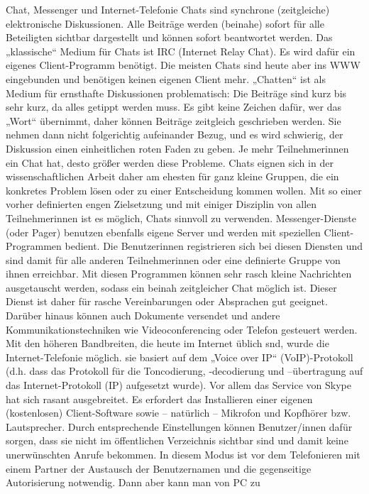\documentclass[]{book}
\theoremstyle{definition}
\theoremstyle{definition}
\theoremstyle{definition}
\theoremstyle{remark}
\begin{document}
Chat, Messenger und Internet-Telefonie Chats sind synchrone
(zeitgleiche) elektronische Diskussionen. Alle Beiträge werden (beinahe)
sofort für alle Beteiligten sichtbar dargestellt und können sofort
beantwortet werden. Das „klassische`` Medium für Chats ist IRC (Internet
Relay Chat). Es wird dafür ein eigenes Client-Programm benötigt. Die
meisten Chats sind heute aber ins WWW eingebunden und benötigen keinen
eigenen Client mehr. „Chatten`` ist als Medium für ernsthafte
Diskussionen problematisch: Die Beiträge sind kurz bis sehr kurz, da
alles getippt werden muss. Es gibt keine Zeichen dafür, wer das „Wort``
übernimmt, daher können Beiträge zeitgleich geschrieben werden. Sie
nehmen dann nicht folgerichtig aufeinander Bezug, und es wird schwierig,
der Diskussion einen einheitlichen roten Faden zu geben. Je mehr
Teilnehmerinnen ein Chat hat, desto größer werden diese Probleme. Chats
eignen sich in der wissenschaftlichen Arbeit daher am ehesten für ganz
kleine Gruppen, die ein konkretes Problem lösen oder zu einer
Entscheidung kommen wollen. Mit so einer vorher definierten engen
Zielsetzung und mit einiger Disziplin von allen Teilnehmerinnen ist es
möglich, Chats sinnvoll zu verwenden. Messenger-Dienste (oder Pager)
benutzen ebenfalls eigene Server und werden mit speziellen
Client-Programmen bedient. Die Benutzerinnen registrieren sich bei
diesen Diensten und sind damit für alle anderen Teilnehmerinnen oder
eine definierte Gruppe von ihnen erreichbar. Mit diesen Programmen
können sehr rasch kleine Nachrichten ausgetauscht werden, sodass ein
beinah zeitgleicher Chat möglich ist. Dieser Dienst ist daher für rasche
Vereinbarungen oder Absprachen gut geeignet. Darüber hinaus können auch
Dokumente versendet und andere Kommunikationstechniken wie
Videoconferencing oder Telefon gesteuert werden. Mit den höheren
Bandbreiten, die heute im Internet üblich snd, wurde die
Internet-Telefonie möglich. sie basiert auf dem „Voice over IP``
(VoIP)-Protokoll (d.h. dass das Protokoll für die Toncodierung,
-decodierung und --übertragung auf das Internet-Protokoll (IP)
aufgesetzt wurde). Vor allem das Service von Skype hat sich rasant
ausgebreitet. Es erfordert das Installieren einer eigenen (kostenlosen)
Client-Software sowie -- natürlich -- Mikrofon und Kopfhörer bzw.
Lautsprecher. Durch entsprechende Einstellungen können Benutzer/innen
dafür sorgen, dass sie nicht im öffentlichen Verzeichnis sichtbar sind
und damit keine unerwünschten Anrufe bekommen. In diesem Modus ist vor
dem Telefonieren mit einem Partner der Austausch der Benutzernamen und
die gegenseitige Autorisierung notwendig. Dann aber kann man von PC zu
\end{document}

